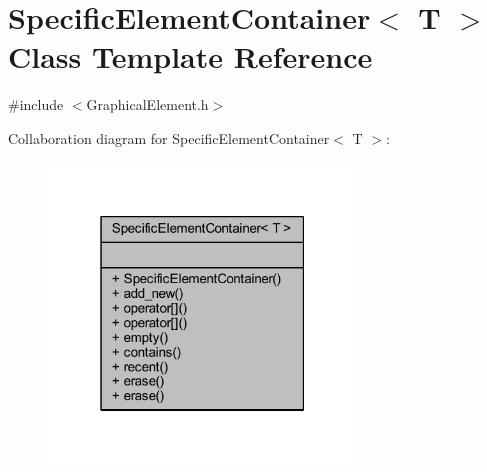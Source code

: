\hypertarget{class_specific_element_container}{}\section{Specific\+Element\+Container$<$ T $>$ Class Template Reference}
\label{class_specific_element_container}


{\ttfamily \#include $<$Graphical\+Element.\+h$>$}



Collaboration diagram for Specific\+Element\+Container$<$ T $>$\+:
\nopagebreak
\begin{figure}[H]
\begin{center}
\leavevmode
\includegraphics[width=232pt]{class_specific_element_container__coll__graph}
\end{center}
\end{figure}

